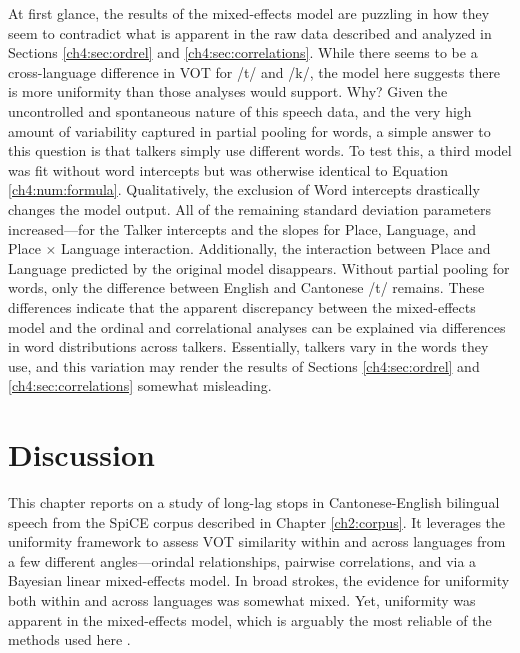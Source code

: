 At first glance, the results of the mixed-effects model are puzzling in how they seem to contradict what is apparent in the raw data described and analyzed in Sections \ref{ch4:sec:ordrel} and \ref{ch4:sec:correlations}. While there seems to be a cross-language difference in VOT for /t/ and /k/, the model here suggests there is more uniformity than those analyses would support. Why? Given the uncontrolled and spontaneous nature of this speech data, and the very high amount of variability captured in partial pooling for words, a simple answer to this question is that talkers simply use different words. To test this, a third model was fit without word intercepts but was otherwise identical to Equation \ref{ch4:num:formula}. Qualitatively, the exclusion of Word intercepts drastically changes the model output. All of the remaining standard deviation parameters increased---for the Talker intercepts and the slopes for Place, Language, and Place $\times$ Language interaction. Additionally, the interaction between Place and Language predicted by the original model disappears. Without partial pooling for words, only the difference between English and Cantonese /t/ remains. These differences indicate that the apparent discrepancy between the mixed-effects model and the ordinal and correlational analyses can be explained via differences in word distributions across talkers. Essentially, talkers vary in the words they use, and this variation may render the results of Sections \ref{ch4:sec:ordrel} and \ref{ch4:sec:correlations} somewhat misleading. 

\section{Discussion}\label{ch4:sec:discuss}

This chapter reports on a study of long-lag stops in Cantonese-English bilingual speech from the SpiCE corpus described in Chapter \ref{ch2:corpus}. It leverages the uniformity framework to assess VOT similarity within and across languages from a few different angles---orindal relationships, pairwise correlations, and via a Bayesian linear mixed-effects model. In broad strokes, the evidence for uniformity both within and across languages was somewhat mixed. Yet, uniformity was apparent in the mixed-effects model, which is arguably the most reliable of the methods used here \citep{haines_2020_theoretically}. 

